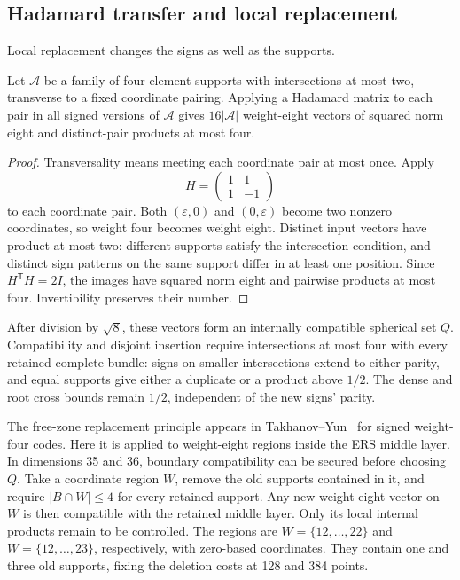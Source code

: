 \subsection{Hadamard transfer and local replacement}

Local replacement changes the signs as well as the supports.

\begin{proposition}
\label{prop:hadamard}
Let $\mathcal A$ be a family of four-element supports with intersections
at most two, transverse to a fixed coordinate pairing. Applying a
Hadamard matrix to each pair in all signed versions of $\mathcal A$
gives $16|\mathcal A|$ weight-eight vectors of squared norm eight and
distinct-pair products at most four.
\end{proposition}
\begin{proof}
Transversality means meeting each coordinate pair at most once. Apply
\[
H=\begin{pmatrix}1&1\\1&-1\end{pmatrix}
\]
to each coordinate pair. Both $(\varepsilon,0)$ and $(0,\varepsilon)$
become two nonzero coordinates, so weight four becomes weight eight.
Distinct input vectors have product at most two: different supports
satisfy the intersection condition, and distinct sign patterns on the same
support differ in at least one position. Since $H^{\mathsf T}H=2I$,
the images have squared norm eight and pairwise products at most four.
Invertibility preserves their number.
\end{proof}

After division by $\sqrt8$, these vectors form an internally compatible
spherical set $Q$. Compatibility and disjoint insertion require
intersections at most four with every retained complete bundle: signs
on smaller intersections extend to either parity, and equal supports
give either a duplicate or a product above $1/2$. The dense and root
cross bounds remain $1/2$, independent of the new signs' parity.

The free-zone replacement principle appears in
Takhanov--Yun~\cite[Section V, Definition 5 and Lemma 4]{signed-johnson}
for signed weight-four codes. Here it is applied to weight-eight
regions inside the ERS middle layer. In dimensions 35 and 36,
boundary compatibility can be secured before
choosing $Q$. Take a coordinate region $W$, remove the old supports
contained in it, and require $|B\cap W|\le4$ for every retained support.
Any new weight-eight vector on $W$ is then compatible with the retained
middle layer. Only its local internal products remain to be controlled.
The regions are $W=\{12,\ldots,22\}$ and $W=\{12,\ldots,23\}$,
respectively, with zero-based coordinates. They contain one and three
old supports, fixing the deletion costs at 128 and 384 points.

